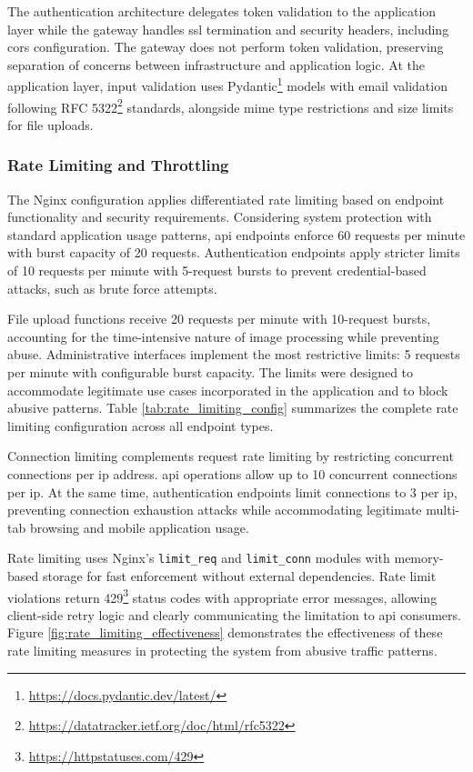 The authentication architecture delegates token validation to the application layer while the gateway handles \ac{ssl} termination and security headers, including \ac{cors} configuration. The gateway does not perform token validation, preserving separation of concerns between infrastructure and application logic. At the application layer, input validation uses Pydantic\footnote{\url{https://docs.pydantic.dev/latest/}} models with email validation following RFC 5322\footnote{\url{https://datatracker.ietf.org/doc/html/rfc5322}} standards, alongside \ac{mime} type restrictions and size limits for file uploads.

\subsubsection{Rate Limiting and Throttling} \label{subsubsection:rate_limiting}

The Nginx configuration applies differentiated rate limiting based on endpoint functionality and security requirements. Considering system protection with standard application usage patterns, \ac{api} endpoints enforce 60 requests per minute with burst capacity of 20 requests. Authentication endpoints apply stricter limits of 10 requests per minute with 5-request bursts to prevent credential-based attacks, such as brute force attempts.

File upload functions receive 20 requests per minute with 10-request bursts, accounting for the time-intensive nature of image processing while preventing abuse. Administrative interfaces implement the most restrictive limits: 5 requests per minute with configurable burst capacity. The limits were designed to accommodate legitimate use cases incorporated in the application and to block abusive patterns. Table \ref{tab:rate_limiting_config} summarizes the complete rate limiting configuration across all endpoint types.

Connection limiting complements request rate limiting by restricting concurrent connections per \ac{ip} address. \ac{api} operations allow up to 10 concurrent connections per \ac{ip}. At the same time, authentication endpoints limit connections to 3 per \ac{ip}, preventing connection exhaustion attacks while accommodating legitimate multi-tab browsing and mobile application usage.

Rate limiting uses Nginx's \texttt{limit\_req} and \texttt{limit\_conn} modules with memory-based storage for fast enforcement without external dependencies. Rate limit violations return 429\footnote{\url{https://httpstatuses.com/429}} status codes with appropriate error messages, allowing client-side retry logic and clearly communicating the limitation to \ac{api} consumers. Figure \ref{fig:rate_limiting_effectiveness} demonstrates the effectiveness of these rate limiting measures in protecting the system from abusive traffic patterns.

